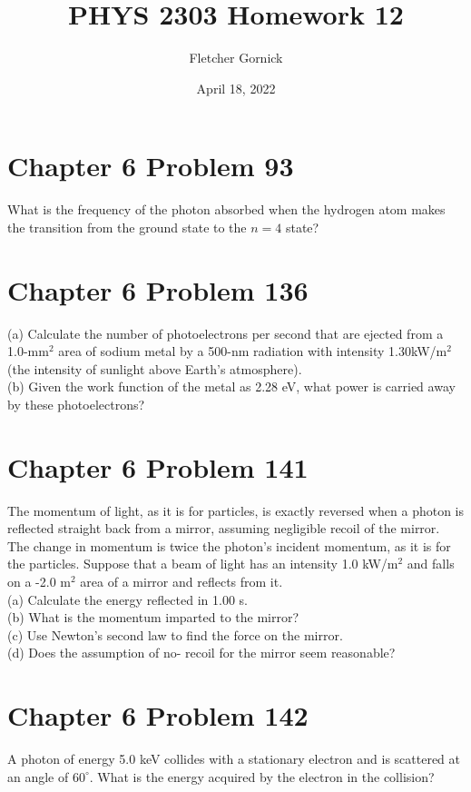 \documentclass[11pt]{article}
\title{\vspace{-1.0cm}PHYS 2303 Homework 12}
\author{Fletcher Gornick}
\date{April 18, 2022}
\begin{document}
 \maketitle
 \section*{Chapter 6 Problem 93}
 What is the frequency of the photon absorbed when the hydrogen atom makes the transition 
 from the ground state to the \(n = 4\) state?
 \newpage

 \section*{Chapter 6 Problem 136}
 (a) Calculate the number of photoelectrons per second that are ejected from a 1.0-mm\(^2\) 
 area of sodium metal by a 500-nm radiation with intensity 1.30kW/m\(^2\) (the intensity of 
 sunlight above Earth’s atmosphere). \\

 (b) Given the work function of the metal as 2.28 eV, what power is carried away by these 
 photoelectrons?
 \newpage

 \section*{Chapter 6 Problem 141}
 The momentum of light, as it is for particles, is exactly reversed when a photon is reflected 
 straight back from a mirror, assuming negligible recoil of the mirror. The change in momentum 
 is twice the photon’s incident momentum, as it is for the particles. Suppose that a beam of
 light has an intensity 1.0 kW/m\(^2\) and falls on a -2.0 m\(^2\) area of a mirror and reflects 
 from it. \\

 (a) Calculate the energy reflected in 1.00 s. \\
 (b) What is the momentum imparted to the mirror? \\
 (c) Use Newton’s second law to find the force on the mirror. \\
 (d) Does the assumption of no- recoil for the mirror seem reasonable?
 \newpage

 \section*{Chapter 6 Problem 142}
 A photon of energy 5.0 keV collides with a stationary electron and is scattered at an angle 
 of \(60^\circ\). What is the energy acquired by the electron in the collision?
\end{document}
